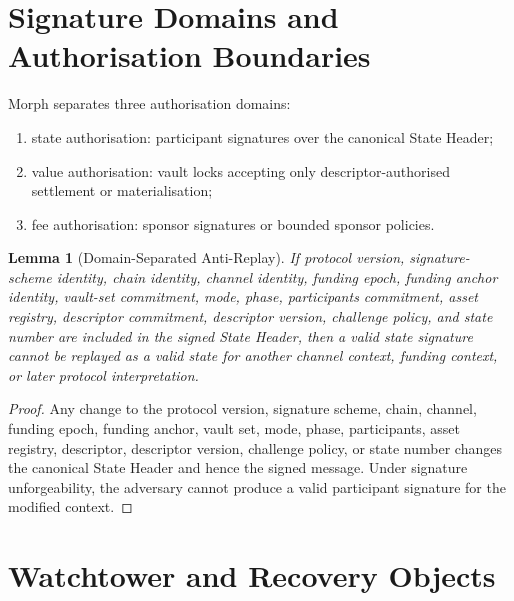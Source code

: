 \documentclass[a4paper,11pt]{article}
\newtheorem{lemma}{Lemma}
\begin{document}
\clearpage
\section{Signature Domains and Authorisation Boundaries}

Morph separates three authorisation domains:
\begin{enumerate}[label=(\arabic*)]
  \item state authorisation: participant signatures over the canonical State Header;
  \item value authorisation: vault locks accepting only descriptor-authorised settlement or materialisation;
  \item fee authorisation: sponsor signatures or bounded sponsor policies.
\end{enumerate}

\begin{lemma}[Domain-Separated Anti-Replay]
If protocol version, signature-scheme identity, chain identity, channel identity, funding epoch, funding anchor identity, vault-set commitment, mode, phase, participants commitment, asset registry, descriptor commitment, descriptor version, challenge policy, and state number are included in the signed State Header, then a valid state signature cannot be replayed as a valid state for another channel context, funding context, or later protocol interpretation.
\end{lemma}

\begin{proof}
Any change to the protocol version, signature scheme, chain, channel, funding epoch, funding anchor, vault set, mode, phase, participants, asset registry, descriptor, descriptor version, challenge policy, or state number changes the canonical State Header and hence the signed message. Under signature unforgeability, the adversary cannot produce a valid participant signature for the modified context.
\end{proof}

\clearpage
\section{Watchtower and Recovery Objects}
\end{document}
